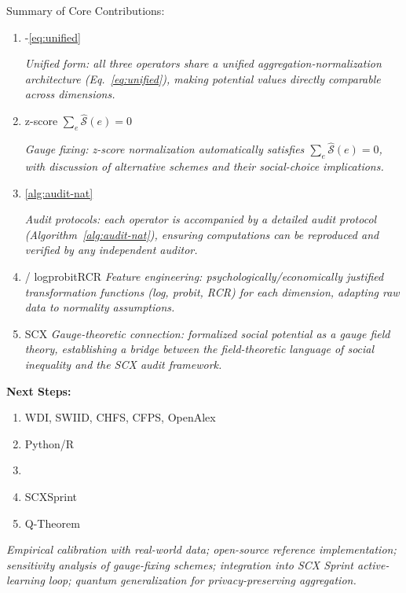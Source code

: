 \documentclass[11pt,a4paper]{article}
\theoremstyle{definition}
\newcommand{\Sop}{\hat{\mathcal{S}}}
\begin{document}
\bigskip
 Summary of Core Contributions:

\begin{enumerate}[leftmargin=*,label=\textbf{(\arabic*)}]
    \item \textbf{}-\ref{eq:unified}
    
    \textit{Unified form: all three operators share a unified aggregation-normalization architecture (Eq.~\ref{eq:unified}), making potential values directly comparable across dimensions.}
    
    \item \textbf{}z-score $\sum_e \Sop(e) = 0$ 
    
    \textit{Gauge fixing: z-score normalization automatically satisfies $\sum_e \Sop(e) = 0$, with discussion of alternative schemes and their social-choice implications.}
    
    \item \textbf{}\ref{alg:audit-nat}
    
    \textit{Audit protocols: each operator is accompanied by a detailed audit protocol (Algorithm~\ref{alg:audit-nat}), ensuring computations can be reproduced and verified by any independent auditor.}
    
    \item \textbf{}/
    logprobitRCR
    \textit{Feature engineering: psychologically/economically justified transformation functions (log, probit, RCR) for each dimension, adapting raw data to normality assumptions.}
    
    \item \textbf{}
    SCX
    \textit{Gauge-theoretic connection: formalized social potential as a gauge field theory, establishing a bridge between the field-theoretic language of social inequality and the SCX audit framework.}
\end{enumerate}

\bigskip
\textbf{ Next Steps:}

\begin{enumerate}[leftmargin=*]
    \item WDI, SWIID, CHFS, CFPS, OpenAlex
    \item Python/R
    \item 
    \item SCXSprint
    \item Q-Theorem
\end{enumerate}

\medskip
\noindent\textit{Empirical calibration with real-world data; open-source reference implementation; sensitivity analysis of gauge-fixing schemes; integration into SCX Sprint active-learning loop; quantum generalization for privacy-preserving aggregation.}
\end{document}
